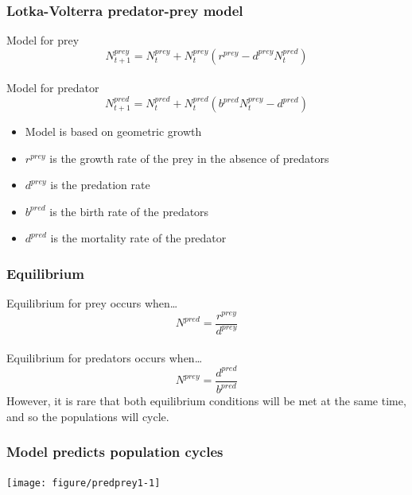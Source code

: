 \documentclass[color=usenames,dvipsnames]{beamer}\usepackage[]{graphicx}\usepackage[]{color}
\begin{document}
\begin{frame}
  \frametitle{Lotka-Volterra predator-prey model}
  \Large
  Model for prey
  \[
    N^{prey}_{t+1} = N^{prey}_t + N^{prey}_t (r^{prey} - d^{prey} N^{pred}_t)
  \] \\
  \vspace{1cm}
  \pause
  Model for predator
  \[
    N^{pred}_{t+1} = N^{pred}_t + N^{pred}_t (b^{pred}N^{prey}_t - d^{pred})
  \]
  \pause
  \vfill
  \normalsize
  \begin{itemize}
    \item Model is based on geometric growth
    \item $r^{prey}$ is the growth rate of the prey in the absence of
      predators
    \item $d^{prey}$ is the predation rate
    \item $b^{pred}$ is the birth rate of the predators
    \item $d^{pred}$ is the mortality rate of the predator
  \end{itemize}
\end{frame}



\begin{frame}
  \frametitle{Equilibrium}
  \Large
  Equilibrium for prey occurs when\dots
  \[
    N^{pred} = \frac{r^{prey}}{d^{prey}}
  \] \\
  \vspace{1cm}
  \pause
  Equilibrium for predators occurs when\dots
  \[
    N^{prey} = \frac{d^{pred}}{b^{pred}}
  \]
  \pause
  \vfill
  \large
  However, it is rare that both equilibrium conditions will be met at
  the same time, and so the populations will cycle.
\end{frame}



\begin{frame}[fragile]
  \frametitle{Model predicts population cycles}
\vspace{-1.2cm}

\begin{center}
  \texttt{[image: figure/predprey1-1]}
\end{center}
\end{frame}
\end{document}
